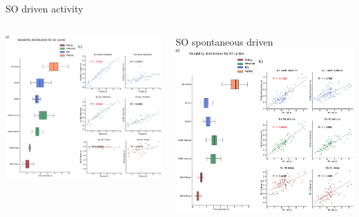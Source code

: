 \documentclass[aspectratio=43]{beamer}
\begin{document}
\begin{frame}{SO driven activity}
{\begin{columns}
\begin{column}{0.6\textwidth}
			\includegraphics[width=\textwidth]{invariants/data/SUSSEX/SO_driven/images/panel_with_intervals_boxplot_invariants.pdf}
		\end{column}
		\begin{column}{0.6\textwidth}
			\centering SO spontaneous driven
			\includegraphics[width=\textwidth]{invariants/data/SUSSEX/prep4_so_driven_2/images/panel_with_intervals_boxplot_invariants.pdf}
		\end{column}
	\end{columns}
}

\end{frame}
\end{document}
